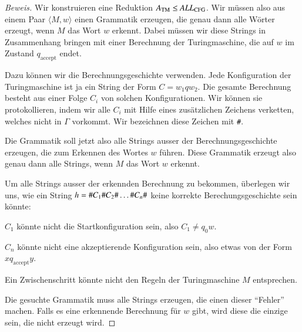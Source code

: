 \begin{proof}[Beweis]
Wir konstruieren eine Reduktion 
$A_{\text{TM}}\le \text{\it ALL}_{\text{CFG}}$.
Wir müssen also aus einem Paar $\langle M,w\rangle$ einen
Grammatik erzeugen, die genau dann alle Wörter erzeugt, wenn
$M$ das Wort $w$ erkennt.
Dabei müssen wir diese Strings in
Zusammenhang bringen mit einer Berechnung der Turingmaschine, die
auf $w$ im Zustand $q_{\text{accept}}$ endet.

Dazu können wir
die Berechnungsgeschichte verwenden.
Jede Konfiguration der
Turingmaschine ist ja ein String der Form $C=w_1qw_2$.
Die gesamte
Berechnung besteht aus einer Folge $C_i$ von solchen Konfigurationen.
Wir können sie protokollieren, indem wir alle $C_i$
mit Hilfe eines zusätzlichen Zeichens verketten,
welches nicht in $\Gamma$ vorkommt.
Wir bezeichnen diese Zeichen
mit {\tt\#}.

Die Grammatik soll jetzt also alle Strings ausser der Berechnungsgeschichte
erzeugen, die zum Erkennen des Wortes $w$ führen.
Diese Grammatik
erzeugt also genau dann alle Strings, wenn $M$ das Wort $w$ erkennt.

Um alle Strings ausser der erkennden Berechnung zu bekommen,
überlegen wir uns, wie ein String
$h={\tt\#}C_1{\tt\#}C_2{\tt\#}\dots{\tt\#}C_n{\tt\#}$
keine korrekte Berechungsgeschichte sein könnte:
\medskip
\begin{compactenum}
\item $C_1$ könnte nicht die Startkonfiguration sein, also
$C_1\ne q_0w$.
\item $C_n$ könnte nicht eine akzeptierende Konfiguration 
sein, also etwas von der Form $xq_{\text{accept}}y$.
\item Ein Zwischenschritt könnte nicht den Regeln der Turingmaschine
$M$ entsprechen.
\end{compactenum}
\medskip
Die gesuchte Grammatik muss alle Strings erzeugen, die einen dieser ``Fehler''
machen.
Falls es eine erkennende Berechnung für $w$ gibt, wird diese
die einzige sein, die nicht erzeugt wird.


\end{proof}
